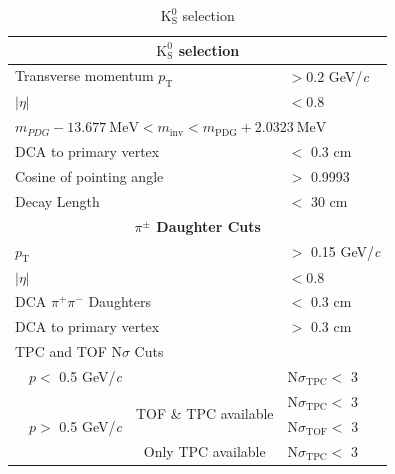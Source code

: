 \documentclass[ALICE,manyauthors]{cernphprep}
\newcommand{\Ks}{$\mathrm{K^{0}_{S}}$\xspace}
\begin{document}
\begin{table}[htbp]
 \centering
  \begin{tabular}{lc|c|l}
   \hline  
   \multicolumn{4}{c}{\textbf{\Ks selection}} \\
   \hline
   \multicolumn{3}{l|}{Transverse momentum $p_{\mathrm{T}}$} & $> 0.2$ GeV/\textit{c} \\
   \hline
   \multicolumn{3}{l|}{$|\eta|$} & $< 0.8$ \\
   \hline
   \multicolumn{4}{l}{$m_{PDG}-13.677 \ \mathrm{MeV} < m_{\mathrm{inv}} < m_{\mathrm{PDG}} + 2.0323 \ \mathrm{MeV}$} \\ 
   \hline
   \multicolumn{3}{l|}{DCA to primary vertex} & $<$ 0.3 cm \\
   \hline
   \multicolumn{3}{l|}{Cosine of pointing angle} & $>$ 0.9993 \\
   \hline
   \multicolumn{3}{l|}{Decay Length} & $<$ 30 cm \\
   \hline
      
   
   \multicolumn{4}{c}{\textbf{$\pi^{\pm}$ Daughter Cuts}} \\
   \hline
   \multicolumn{3}{l|}{$p_{\mathrm{T}}$} & $>$ 0.15 GeV/\textit{c} \\
   \hline
   \multicolumn{3}{l|}{$|\eta|$} &  $< 0.8$ \\
   \hline
   \multicolumn{3}{l|}{DCA $\pi^{+}\pi^{-}$ Daughters} & $<$ 0.3 cm \\
   \hline
   \multicolumn{3}{l|}{DCA to primary vertex} & $>$ 0.3 cm \\
   \hline
   \multicolumn{4}{l}{TPC and TOF N$\sigma$ Cuts} \\
    & \multicolumn{1}{c}{$p <$ 0.5 GeV/\textit{c}} &  & N$\sigma_{\mathrm{TPC}} <$ 3 \\
   \cline{2-4}
    & \multicolumn{1}{c}{\multirow{3}{*}{$p >$ 0.5 GeV/\textit{c}}} &  \multirow{2}{*}{TOF \& TPC available} & N$\sigma_{\mathrm{TPC}} <$ 3 \\
    & \multicolumn{2}{c|}{} & N$\sigma_{\mathrm{TOF}} <$ 3 \\
   \cline{3-4}
    & \multicolumn{1}{c}{} & Only TPC available & N$\sigma_{\mathrm{TPC}} <$ 3 \\
   \hline   
  \end{tabular}
 \caption{\Ks selection}
 \label{tab:K0sCuts} 
\end{table}
\end{document}

